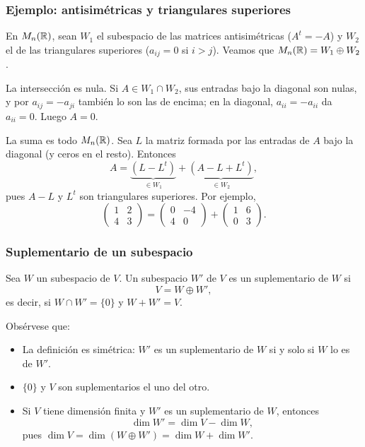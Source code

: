 \begin{frame}
    \frametitle{Ejemplo: antisimétricas y triangulares superiores}

    \begin{example}
        En $M_n(\mathbb{R})$, sean $W_1$ el subespacio de las matrices
        \alert{antisimétricas} ($A^t=-A$) y $W_2$ el de las
        \alert{triangulares superiores} ($a_{ij}=0$ si $i>j$). Veamos que
        $M_n(\mathbb{R})=W_1\oplus W_2$.
    \end{example}

    \alert{La intersección es nula.} Si $A\in W_1\cap W_2$, sus entradas
    bajo la diagonal son nulas, y por $a_{ij}=-a_{ji}$ también lo son las
    de encima; en la diagonal, $a_{ii}=-a_{ii}$ da $a_{ii}=0$. Luego $A=0$.

    \alert{La suma es todo $M_n(\mathbb{R})$.} Sea $L$ la matriz formada por las
    entradas de $A$ bajo la diagonal (y ceros en el resto). Entonces
    \[
        A=\underbrace{(L-L^t)}_{\in W_1}+\underbrace{(A-L+L^t)}_{\in W_2},
    \]
    pues $A-L$ y $L^t$ son triangulares superiores. Por ejemplo,
    \[
        \begin{pmatrix}1&2\\4&3\end{pmatrix}
        =\begin{pmatrix}0&-4\\4&0\end{pmatrix}
        +\begin{pmatrix}1&6\\0&3\end{pmatrix}.
    \]
\end{frame}


\begin{frame}
    \frametitle{Suplementario de un subespacio}

    \begin{definition}
        Sea $W$ un subespacio de $V$. Un subespacio $W'$ de $V$ es un
        \alert{suplementario} de $W$ si
        \[
            V=W\oplus W',
        \]
        es decir, si $W\cap W'=\{0\}$ y $W+W'=V$.
    \end{definition}

    Obsérvese que:
    \begin{itemize}
        \item La definición es simétrica: $W'$ es un suplementario de $W$ si
        y solo si $W$ lo es de $W'$.
        \item $\{0\}$ y $V$ son suplementarios el uno del otro.
        \item Si $V$ tiene dimensión finita y $W'$ es un suplementario
        de $W$, entonces
        \[
            \dim W'=\dim V-\dim W,
        \]
        pues $\dim V=\dim(W\oplus W')=\dim W+\dim W'$.
    \end{itemize}
\end{frame}


